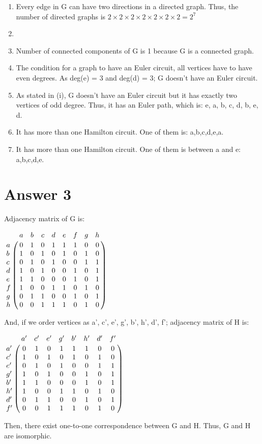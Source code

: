 \documentclass[12pt]{article}
\begin{document}
\begin{enumerate}
    \begin{center}
    \end{center}
    \item Every edge in G can have two directions in a directed graph. Thus, the number of directed graphs is $2\times2\times2\times2\times2\times2\times2 = 2^7$
    \item 
    \item Number of connected components of G is 1 because G is a connected graph.
    \item The condition for a graph to have an Euler circuit, all vertices have to have even degrees. As deg(e) = 3 and deg(d) = 3; G doesn't have an Euler circuit.
    \item As stated in (i), G doesn't have an Euler circuit but it has exactly two vertices of odd degree. Thus, it has an Euler path, which is: e, a, b, c, d, b, e, d.
    \item It has more than one Hamilton circuit. One of them is: a,b,c,d,e,a.
    \item It has more than one Hamilton circuit. One of them is between a and e: a,b,c,d,e.
\end{enumerate}

\section*{Answer 3}
Adjacency matrix of G is:
    \begin{center}
        $\bordermatrix{~ & a & b & c & d & e & f & g & h \cr 
        a & 0 & 1 & 0 & 1 & 1 & 1 & 0 & 0 \cr
        b & 1 & 0 & 1 & 0 & 1 & 0 & 1 & 0 \cr
        c & 0 & 1 & 0 & 1 & 0 & 0 & 1 & 1 \cr
        d & 1 & 0 & 1 & 0 & 0 & 1 & 0 & 1 \cr
        e & 1 & 1 & 0 & 0 & 0 & 1 & 0 & 1 \cr
        f & 1 & 0 & 0 & 1 & 1 & 0 & 1 & 0 \cr
        g & 0 & 1 & 1 & 0 & 0 & 1 & 0 & 1 \cr
        h & 0 & 0 & 1 & 1 & 1 & 0 & 1 & 0 \cr
        }$
    \end{center}
    And, if we order vertices as a', c', e', g', b', h', d', f'; adjacency matrix of H is:
    \begin{center}
        $\bordermatrix{~ & a' & c' & e' & g' & b' & h' & d' & f' \cr 
        a' & 0 & 1 & 0 & 1 & 1 & 1 & 0 & 0 \cr
        c' & 1 & 0 & 1 & 0 & 1 & 0 & 1 & 0 \cr
        e' & 0 & 1 & 0 & 1 & 0 & 0 & 1 & 1 \cr
        g' & 1 & 0 & 1 & 0 & 0 & 1 & 0 & 1 \cr
        b' & 1 & 1 & 0 & 0 & 0 & 1 & 0 & 1 \cr
        h' & 1 & 0 & 0 & 1 & 1 & 0 & 1 & 0 \cr
        d' & 0 & 1 & 1 & 0 & 0 & 1 & 0 & 1 \cr
        f' & 0 & 0 & 1 & 1 & 1 & 0 & 1 & 0 \cr
        }$
    \end{center}
    Then, there exist one-to-one correspondence between G and H. Thus, G and H are isomorphic.
\end{document}
